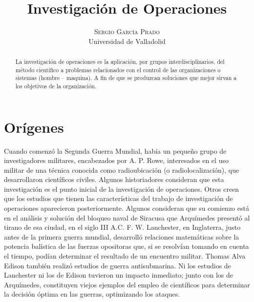 \documentclass[12pt, a4paper,spanish]{article}
\title{\vspace{-15mm}\fontsize{24pt}{10pt}\selectfont\textbf{Investigación de Operaciones}} %
\author{
\large
\textsc{Sergio García Prado}\\[2mm] %
\normalsize Universidad de Valladolid \\ %
\vspace{-5mm}
}
\date{}
\begin{document}
	\maketitle %

	\thispagestyle{fancy} %


	\begin{abstract}
		\noindent La investigación de operaciones es la aplicación, por grupos interdisciplinarios, del método científico  a problemas relacionados con el control de las organizaciones o sistemas (hombre – maquina). A fin de que se produzcan soluciones que mejor sirvan a los objetivos de la organización.\cite{churchman_ackoff_Arnoff_io}
	\end{abstract}

	\section{Orígenes}

		\paragraph{}
		Cuando comenzó la Segunda Guerra Mundial, había un pequeño grupo de investigadores militares, encabezados por A. P. Rowe, interesados en el uso militar de una técnica conocida como radioubicación (o radiolocalización), que desarrollaron científicos civiles. Algunos historiadores consideran que esta investigación es el punto inicial de la investigación de operaciones. Otros creen que los estudios que tienen las características del trabajo de investigación de operaciones aparecieron posteriormente. Algunos consideran que su comienzo está en el análisis y solución del bloqueo naval de Siracusa que Arquímedes presentó al tirano de esa ciudad, en el siglo III A.C. F. W. Lanchester, en Inglaterra, justo antes de la primera guerra mundial, desarrolló relaciones matemáticas sobre la potencia balística de las fuerzas opositoras que, si se resolvían tomando en cuenta el tiempo, podían determinar el resultado de un encuentro militar. Thomas Alva Edison también realizó estudios de guerra antisubmarina. Ni los estudios de Lanchester ni los de Edison tuvieron un impacto inmediato; junto con los de Arquímedes, constituyen viejos ejemplos del empleo de científicos para determinar la decisión óptima en las guerras, optimizando los ataques. \cite{wikipedia_IO}
\end{document}
